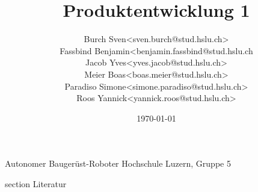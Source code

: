 \documentclass[oneside]{modern}
\title{Produktentwicklung 1}
\author{
\begin{tabular}{ l l }
  Burch Sven & <sven.burch@stud.hslu.ch> \\
  Fassbind Benjamin & <benjamin.fassbind@stud.hslu.ch \\
  Jacob Yves & <yves.jacob@stud.hslu.ch> \\
  Meier Boas & <boas.meier@stud.hslu.ch> \\
  Paradiso Simone & <simone.paradiso@stud.hslu.ch> \\
  Roos Yannick & <yannick.roos@stud.hslu.ch>
\end{tabular}
}
\date{\today}
\begin{document}
   \renewcommand{\thesection}{\arabic{section}}
   \makeatletter
   \g@addto@macro{\UrlBreaks}{\UrlOrds}
   \makeatother
   


  \nocite{*}

  \firstpage
    {Autonomer Baugerüst-Roboter}
    {Hochschule Luzern, Gruppe 5}
    {\theauthor}

  
  
  \newpage
  \addtableofcontents
  
  \newpage
  \listoffigures
  
  \newpage
  \listoftables

  \newpage
  
  

  
  
  
  
  
  
  
  

  \newpage
  \addglossary

  \newpage
    {section}
    {Literatur}

  \printbibliography[
    heading=subbibliography
  ]
  

\end{document}
